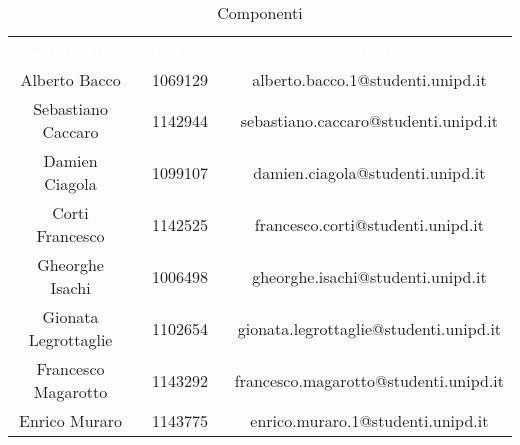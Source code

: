 \begin{table}[H]
	\centering
	\begin{tabular}{ccc}
	\rowcolor{greySWEight}
	    \textcolor{white}{\textbf{Nominativo}} &
	    \textcolor{white}{\textbf{Matricola}}&
	    \textcolor{white}{\textbf{Email}}
    \\
    Alberto Bacco &
    1069129 &
    alberto.bacco.1@studenti.unipd.it 
    \\
    Sebastiano Caccaro &
    1142944 &
    sebastiano.caccaro@studenti.unipd.it 
    \\
    Damien Ciagola &
    1099107 &
    damien.ciagola@studenti.unipd.it 
    \\
    Corti Francesco &
    1142525 &
    francesco.corti@studenti.unipd.it 
    \\
    Gheorghe Isachi &
    1006498 &
    gheorghe.isachi@studenti.unipd.it 
    \\
    Gionata Legrottaglie &
    1102654 &
    gionata.legrottaglie@studenti.unipd.it 
    \\
    Francesco Magarotto &
    1143292 &
    francesco.magarotto@studenti.unipd.it 
    \\
    Enrico Muraro &
    1143775 &
    enrico.muraro.1@studenti.unipd.it 
    \\    
	\end{tabular}
	\caption{Componenti}
\end{table}

    